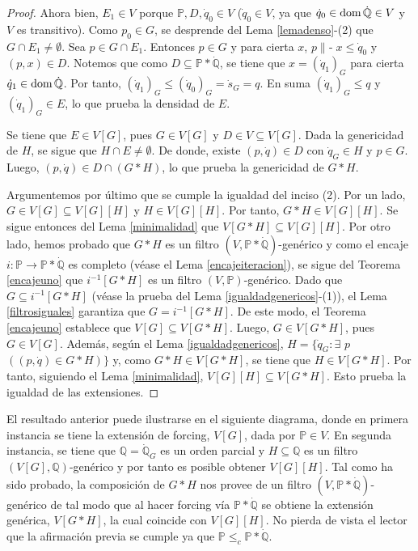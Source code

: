 \documentclass[11pt]{unam_tesis1}
\theoremstyle{MyThmStyle}
\theoremstyle{definition}
\theoremstyle{plain}
\theoremstyle{remark}
\def\dom{\mathop{\rm dom}\nolimits}
\def\forces{\mathop{\parallel\!\!\!-}\nolimits}
\let\Vdash\forces
\let\leq\leqslant
\begin{document}
\begin{proof}
Ahora bien, $E_1\in V$ porque $\mathbb P,D, \dot q_0\in V$ ($\dot q_0\in V$, ya que $\dot q_0\in \dom \dot{\mathbb Q}\in V$ y $V$ es transitivo). Como $p_0\in G$, se desprende del Lema \ref{lemadenso}-(2) que $G\cap E_1\neq \emptyset$. Sea $p\in G\cap E_1$. Entonces $p\in G$ y para cierta $x$, $p\Vdash x\leq \dot q_0$ y $(p,x)\in D$. Notemos que como $D\subseteq \mathbb P*\dot{\mathbb Q}$, se tiene que $x=(\dot q_1)_G$ para cierta $\dot q_1\in \dom \dot{\mathbb Q}$. Por tanto, $(\dot q_1)_G\leq (\dot q_0)_G=\dot s_G=q$. En suma $(\dot q_1)_G\leq q$ y $(\dot q_1)_G\in E$, lo que prueba la densidad de $E$.

Se tiene que $E\in V[G]$, pues $G\in V[G]$ y $D\in V\subseteq V[G]$. Dada la genericidad de $H$, se sigue que $H\cap E\neq \emptyset$. De donde, existe $(p,\dot q)\in D$ con $\dot q_G\in H$ y $p\in G$. Luego, $(p,\dot q)\in D\cap (G*H)$, lo que prueba la genericidad de $G*H$.

Argumentemos por \'ultimo que se cumple la igualdad del inciso (2). Por un lado, $G\in V[G]\subseteq V[G][H]$ y $H\in V[G][H]$. Por tanto, $G*H\in V[G][H]$. Se sigue entonces del Lema \ref{minimalidad} que $V[G*H]\subseteq V[G][H]$. Por otro lado, hemos probado que $G*H$ es un filtro $(V,\mathbb P*\dot{\mathbb Q})$-gen\'erico y como el encaje $i:\mathbb P\to \mathbb P*\dot{\mathbb Q}$ es completo (v\'ease el Lema \ref{encajeiteracion}), se sigue del Teorema \ref{encajeuno} que $i^{-1}[G*H]$ es un filtro $(V,\mathbb P)$-gen\'erico. Dado que $G\subseteq i^{-1}[G*H]$ (v\'ease la prueba del Lema \ref{igualdadgenericos}-(1)), el Lema \ref{filtrosiguales} garantiza que $G=i^{-1}[G*H]$. De este modo, el Teorema \ref{encajeuno} establece que $V[G]\subseteq V[G*H]$. Luego, $G\in V[G*H]$, pues $G\in V[G]$. Adem\'as, seg\'un el Lema \ref{igualdadgenericos}, $H=\{\dot q_G:\exists$ $p$ $((p,\dot q)\in G*H)\}$ y, como $G*H\in V[G*H]$, se tiene que $H\in V[G*H]$. Por tanto, siguiendo el Lema \ref{minimalidad}, $V[G][H]\subseteq V[G*H]$. Esto prueba la igualdad de las extensiones.
\end{proof}

El resultado anterior puede ilustrarse en el siguiente diagrama, donde en primera ins\-tan\-cia se tiene la extensi\'on de forcing, $V[G]$, dada por $\mathbb P\in V$. En segunda instancia, se tiene que $\mathbb Q=\dot{\mathbb Q}_G$ es un orden parcial y $H\subseteq \mathbb Q$ es un filtro $(V[G], \mathbb Q)$-gen\'erico y por tanto es posible obtener $V[G][H]$. Tal como ha sido probado, la composici\'on de $G*H$ nos provee de un filtro $(V,\mathbb P*\dot{\mathbb Q})$-gen\'erico de tal modo que al hacer forcing v\'ia $\mathbb P*\dot{\mathbb Q}$ se obtiene la extensi\'on gen\'erica, $V[G*H]$, la cual coincide con $V[G][H]$. No pierda de vista el lector que la afirmaci\'on previa se cumple ya que $\mathbb P\leq_c \mathbb P*\dot{\mathbb Q}$.
\end{document}
